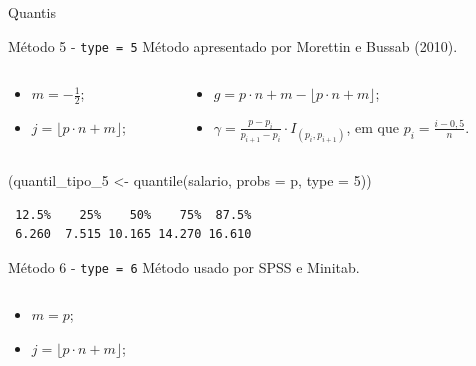 \documentclass[
  10pt,
  ignorenonframetext,
]{beamer}
\newenvironment{Shaded}{\begin{snugshade}}{\end{snugshade}}
\newcommand{\AttributeTok}[1]{\textcolor[rgb]{0.40,0.45,0.13}{#1}}
\newcommand{\DecValTok}[1]{\textcolor[rgb]{0.68,0.00,0.00}{#1}}
\newcommand{\FunctionTok}[1]{\textcolor[rgb]{0.28,0.35,0.67}{#1}}
\newcommand{\NormalTok}[1]{\textcolor[rgb]{0.00,0.23,0.31}{#1}}
\newcommand{\OtherTok}[1]{\textcolor[rgb]{0.00,0.23,0.31}{#1}}
\providecommand{\tightlist}{%
  \setlength{\itemsep}{0pt}\setlength{\parskip}{0pt}}\usepackage{longtable,booktabs,array}
\begin{document}
\begin{frame}[fragile]{Quantis}
\protect\hypertarget{quantis-4}{}
\begin{block}{Método 5 - \texttt{type\ =\ 5}}
\protect\hypertarget{muxe9todo-5---type-5}{}
Método apresentado por Morettin e Bussab (2010).

\begin{columns}[T]
\begin{column}{0.3\textwidth}
\begin{itemize}
\tightlist
\item
  \(m=-\frac{1}{2}\);
\item
  \(j=\lfloor p\cdot n + m \rfloor\);
\end{itemize}
\end{column}

\begin{column}{0.7\textwidth}
\begin{itemize}
\tightlist
\item
  \(g = p\cdot n + m- \lfloor p\cdot n+m \rfloor\);
\item
  \(\gamma = \frac{p-p_i}{p_{i+1} - p_i}\cdot I_{(p_i, p_{i+1})}\), em
  que \(p_i=\frac{i-0,5}{n}\).
\end{itemize}
\end{column}
\end{columns}

\begin{Shaded}
\begin{Highlighting}[]
\NormalTok{(quantil\_tipo\_5 }\OtherTok{\textless{}{-}} \FunctionTok{quantile}\NormalTok{(salario, }\AttributeTok{probs =}\NormalTok{ p, }\AttributeTok{type =} \DecValTok{5}\NormalTok{))}
\end{Highlighting}
\end{Shaded}

\begin{verbatim}
 12.5%    25%    50%    75%  87.5% 
 6.260  7.515 10.165 14.270 16.610 
\end{verbatim}
\end{block}

\begin{block}{Método 6 - \texttt{type\ =\ 6}}
\protect\hypertarget{muxe9todo-6---type-6}{}
Método usado por SPSS e Minitab.

\begin{columns}[T]
\begin{column}{0.5\textwidth}
\begin{itemize}
\tightlist
\item
  \(m=p\);
\item
  \(j=\lfloor p\cdot n + m \rfloor\);
\end{itemize}
\end{column}


\end{columns}
\end{block}
\end{frame}
\end{document}
